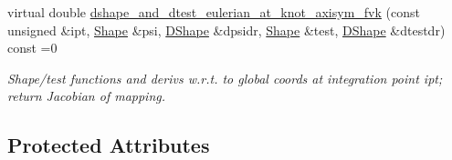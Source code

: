 \begin{DoxyCompactItemize}
virtual double \hyperlink{classoomph_1_1AxisymFoepplvonKarmanEquations_a456a9c27c326d6d1e55e3ab822ac1a5f}{dshape\+\_\+and\+\_\+dtest\+\_\+eulerian\+\_\+at\+\_\+knot\+\_\+axisym\+\_\+fvk} (const unsigned \&ipt, \hyperlink{classoomph_1_1Shape}{Shape} \&psi, \hyperlink{classoomph_1_1DShape}{D\+Shape} \&dpsidr, \hyperlink{classoomph_1_1Shape}{Shape} \&test, \hyperlink{classoomph_1_1DShape}{D\+Shape} \&dtestdr) const =0
\begin{DoxyCompactList}\small\item\em Shape/test functions and derivs w.\+r.\+t. to global coords at integration point ipt; return Jacobian of mapping. \end{DoxyCompactList}\end{DoxyCompactItemize}
\subsection*{Protected Attributes}
